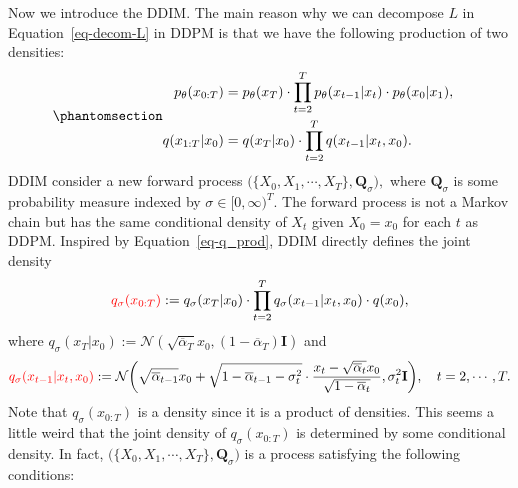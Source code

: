 \documentclass[
]{article}
\theoremstyle{remark}
\begin{document}
Now we introduce the DDIM. The main reason why we can decompose \(L\) in
Equation~\ref{eq-decom-L} in DDPM is that we have the following
production of two densities:
\begin{equation}\phantomsection\label{eq-q_prod}{
\begin{aligned}
  p_{\theta}(x_{0:T}) &= p_{\theta}(x_T) \cdot \prod_{t=2}^T p_{\theta}(x_{t-1}\vert x_t) \cdot  p_{\theta}(x_0\vert x_1) , \cr 
  q(x_{1:T}\vert x_0) &= q(x_T\vert x_0) \cdot \prod_{t=2}^{T} q(x_{t-1} \vert x_{t}, x_0).
\end{aligned}
}\end{equation} DDIM consider a new forward process
\(\bigl( \lbrace X_0,X_1,\cdots,X_T\rbrace, \mathbf{Q}_{\sigma} \bigr),\)
where \(\mathbf{Q}_{\sigma}\) is some probability measure indexed by
\(\sigma\in [0,\infty)^T\). The forward process is not a Markov chain
but has the same conditional density of \(X_{t}\) given \(X_0=x_0\) for
each \(t\) as DDPM. Inspired by Equation~\ref{eq-q_prod}, DDIM directly
defines the joint density \[
\begin{aligned}
  {\color{red}{q_{\sigma}(x_{0:T})}} := q_{\sigma}(x_T\vert x_0) \cdot \prod_{t=2}^T q_{\sigma}(x_{t-1}\vert x_t, x_0) \cdot q(x_0),
\end{aligned}
\] where
\(q_{\sigma}(x_T\vert x_0):=\mathcal{N}(\sqrt{\overline{\alpha}_T}x_0,(1-\overline{\alpha}_T)\mathbf{I})\)
and \[
\begin{aligned}
  {\color{red}{q_{\sigma} (x_{t-1}\vert x_t,x_0)}}
  := \mathcal{N}\biggl( \sqrt{\overline{\alpha}_{t-1}}x_0 + \sqrt{1-\overline{\alpha}_{t-1} - \sigma_t^2} \cdot \frac{x_t-\sqrt{\overline{\alpha}_t}x_0}{\sqrt{1-\overline{\alpha}_t}} , \sigma_t^2 \mathbf{I} \biggr), \quad t=2,\cdots, T.
\end{aligned}
\] Note that \(q_{\sigma}(x_{0:T})\) is a density since it is a product
of densities. This seems a little weird that the joint density of
\(q_{\sigma}(x_{0:T})\) is determined by some conditional density. In
fact,
\(\bigl(\lbrace X_0,X_1,\cdots,X_T \rbrace,\mathbf{Q}_{\sigma}\bigr)\)
is a process satisfying the following conditions:
\end{document}
